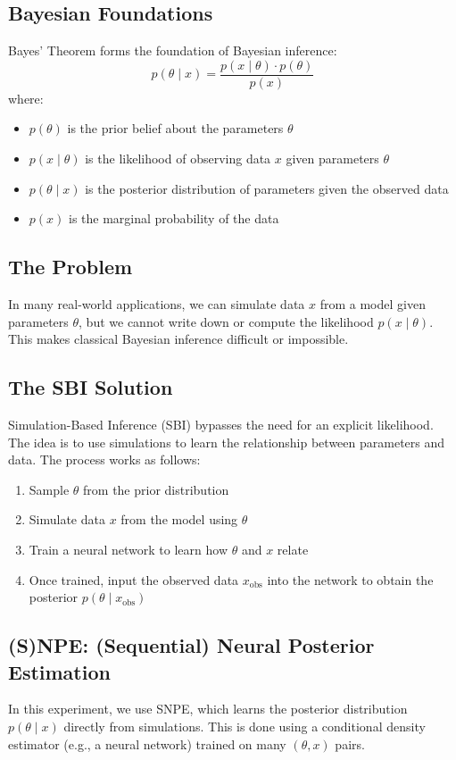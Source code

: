 \documentclass{article}
\begin{document}
\subsection*{Bayesian Foundations}
Bayes' Theorem forms the foundation of Bayesian inference:
\[
p(\theta \mid x) = \frac{p(x \mid \theta) \cdot p(\theta)}{p(x)}
\]
where:
\begin{itemize}
    \item $p(\theta)$ is the prior belief about the parameters $\theta$
    \item $p(x \mid \theta)$ is the likelihood of observing data $x$ given parameters $\theta$
    \item $p(\theta \mid x)$ is the posterior distribution of parameters given the observed data
    \item $p(x)$ is the marginal probability of the data
\end{itemize}

\subsection*{The Problem}
In many real-world applications, we can simulate data $x$ from a model given parameters $\theta$, but we cannot write down or compute the likelihood $p(x \mid \theta)$. This makes classical Bayesian inference difficult or impossible.

\subsection*{The SBI Solution}
Simulation-Based Inference (SBI) bypasses the need for an explicit likelihood. The idea is to use simulations to learn the relationship between parameters and data. The process works as follows:

\begin{enumerate}
    \item Sample $\theta$ from the prior distribution
    \item Simulate data $x$ from the model using $\theta$
    \item Train a neural network to learn how $\theta$ and $x$ relate
    \item Once trained, input the observed data $x_{\text{obs}}$ into the network to obtain the posterior $p(\theta \mid x_{\text{obs}})$
\end{enumerate}

\subsection*{(S)NPE: (Sequential) Neural Posterior Estimation}
In this experiment, we use SNPE, which learns the posterior distribution $p(\theta \mid x)$ directly from simulations. This is done using a conditional density estimator (e.g., a neural network) trained on many $(\theta, x)$ pairs.
\end{document}
